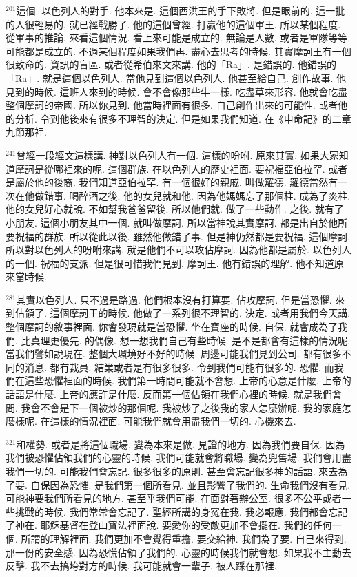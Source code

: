 \documentclass{book}
\begin{document}
$^{201}$這個.
以色列人的對手.
他本來是.
這個西洪王的手下敗將.
但是眼前的.
這一批的人很輕易的.
就已經戰勝了.
他的這個曾經.
打贏他的這個軍王.
所以某個程度.
從軍事的推論.
來看這個情況.
看上來可能是成立的.
無論是人數.
或者是軍隊等等.
可能都是成立的.
不過某個程度如果我們再.
盡心去思考的時候.
其實摩訶王有一個很致命的.
資訊的盲區.
或者從希伯來文來講.
他的「Ra」.
是錯誤的.
他錯誤的「Ra」.
就是這個以色列人.
當他見到這個以色列人.
他甚至給自己.
創作故事.
他見到的時候.
這班人來到的時候.
會不會像那些牛一樣.
吃盡草來形容.
他就會吃盡整個摩訶的帝國.
所以你見到.
他當時裡面有很多.
自己創作出來的可能性.
或者他的分析.
令到他後來有很多不理智的決定.
但是如果我們知道.
在《申命記》的二章九節那裡.

$^{241}$曾經一段經文這樣講.
神對以色列人有一個.
這樣的吩咐.
原來其實.
如果大家知道摩訶是從哪裡來的呢.
這個群族.
在以色列人的歷史裡面.
要祝福亞伯拉罕.
或者是屬於他的後裔.
我們知道亞伯拉罕.
有一個很好的親戚.
叫做羅德.
羅德當然有一次在他做錯事.
喝醉酒之後.
他的女兒就和他.
因為他媽媽忘了那個柱.
成為了炎柱.
他的女兒好心就說.
不如幫我爸爸留後.
所以他們就.
做了一些動作.
之後.
就有了小朋友.
這個小朋友其中一個.
就叫做摩訶.
所以當神說其實摩訶.
都是出自於他所要祝福的群族.
所以從此以後.
雖然他做錯了事.
但是神仍然都是要祝福.
這個摩訶.
所以對以色列人的吩咐來講.
就是他們不可以攻佔摩訶.
因為他都是屬於.
以色列人的一個.
祝福的支派.
但是很可惜我們見到.
摩訶王.
他有錯誤的理解.
他不知道原來當時候.

$^{281}$其實以色列人.
只不過是路過.
他們根本沒有打算要.
佔攻摩訶.
但是當恐懼.
來到佔領了.
這個摩訶王的時候.
他做了一系列很不理智的.
決定.
或者用我們今天講.
整個摩訶的敘事裡面.
你會發現就是當恐懼.
坐在寶座的時候.
自保.
就會成為了我們.
比真理更優先.
的偶像.
想一想我們自己有些時候.
是不是都會有這樣的情況呢.
當我們譬如說現在.
整個大環境好不好的時候.
周邊可能我們見到公司.
都有很多不同的消息.
都有裁員.
結業或者是有很多很多.
令到我們可能有很多的.
恐懼.
而我們在這些恐懼裡面的時候.
我們第一時間可能就不會想.
上帝的心意是什麼.
上帝的話語是什麼.
上帝的應許是什麼.
反而第一個佔領在我們心裡的時候.
就是我們會問.
我會不會是下一個被炒的那個呢.
我被炒了之後我的家人怎麼辦呢.
我的家庭怎麼樣呢.
在這樣的情況裡面.
可能我們就會用盡我們一切的.
心機來去.

$^{321}$和權勢.
或者是將這個職場.
變為本來是做.
見證的地方.
因為我們要自保.
因為我們被恐懼佔領我們的心靈的時候.
我們可能就會將職場.
變為兜售場.
我們會用盡我們一切的.
可能我們會忘記.
很多很多的原則.
甚至會忘記很多神的話語.
來去為了要.
自保因為恐懼.
是我們第一個所看見.
並且影響了我們的.
生命我們沒有看見.
可能神要我們所看見的地方.
甚至乎我們可能.
在面對著辦公室.
很多不公平或者一些挑戰的時候.
我們常常會忘記了.
聖經所講的身冤在我.
我必報應.
我們都會忘記了神在.
耶穌基督在登山寶法裡面說.
要愛你的受敵更加不會擺在.
我們的任何一個.
所謂的理解裡面.
我們更加不會覺得重擔.
要交給神.
我們為了要.
自己來得到.
那一份的安全感.
因為恐慌佔領了我們的.
心靈的時候我們就會想.
如果我不主動去反擊.
我不去搞垮對方的時候.
我可能就會一輩子.
被人踩在那裡.
\end{document}
